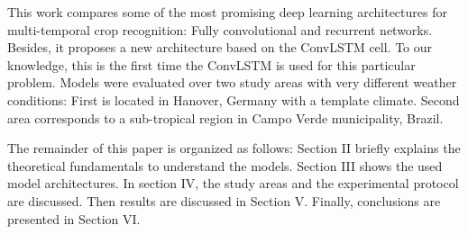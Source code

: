 This work compares some of the most promising deep learning architectures for multi-temporal crop recognition: Fully convolutional and recurrent networks. Besides, it proposes a new architecture based on the ConvLSTM cell. To our knowledge, this is the first time the ConvLSTM is used for this particular problem. Models were evaluated over two study areas with very different weather conditions: First is located in Hanover, Germany with a template climate. Second area corresponds to a sub-tropical region in Campo Verde municipality, Brazil. 

The remainder of this paper is organized as follows: Section II briefly explains the theoretical fundamentals to understand the models. Section III shows the used model architectures. In section IV, the study areas and the experimental protocol are discussed. Then results are discussed in Section V. Finally, conclusions are presented in Section VI.